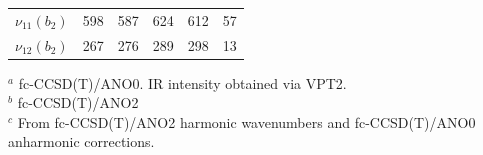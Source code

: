 \begin{table}[ht]
\begin{center}
\begin{tabular}{rrrrrr}
        $\nu_{11}(b_2)$ &  598  &  587 &  624 &  612 &  57  \\ %
        $\nu_{12}(b_2)$ &  267  &  276 &  289 &  298 &  13  \\ %
        \bottomrule
        \hline
    \end{tabular}
    \end{center}
    $^a$ fc-CCSD(T)/ANO0. IR intensity obtained via VPT2.\\
    $^b$ fc-CCSD(T)/ANO2\\
    $^c$ From fc-CCSD(T)/ANO2 harmonic wavenumbers and fc-CCSD(T)/ANO0 anharmonic corrections.

\end{table}

